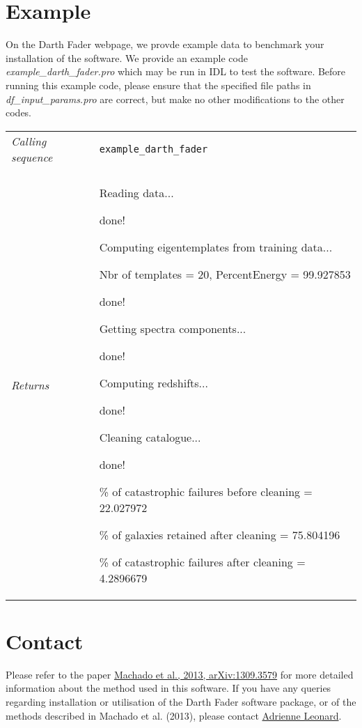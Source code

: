 \documentclass[a4paper]{article}
\begin{document}
\section{Example}

On the Darth Fader webpage, we provde example data to benchmark your installation of the software. We provide an example code {\em example\_darth\_fader.pro} which may be run in IDL to test the software. Before running this example code, please ensure that the specified file paths in {\em df\_input\_params.pro} are correct, but make no other modifications to the other codes. 

\noindent\begin{tabularx}{\textwidth}{LI}
{\em Calling sequence} & \texttt{example\_darth\_fader}\\
 & \\
{\em Returns} & Reading data...

done!

Computing eigentemplates from training data...

Nbr of templates =           20, PercentEnergy =        99.927853

done!

Getting spectra components...

done!

Computing redshifts...

done!

Cleaning catalogue...

done!

\% of catastrophic failures before cleaning =        22.027972

\% of galaxies retained after cleaning =        75.804196

\% of catastrophic failures after cleaning =        4.2896679 
\end{tabularx}

\section{Contact}

Please refer to the paper {\color{blue}
  \href{http://arxiv.org/abs/1309.3579}{Machado et al., 2013,
    arXiv:1309.3579}} for more detailed information about the method
used in this software. If you have any queries regarding installation
or utilisation of the Darth Fader software package, or of the methods
described in Machado et al. (2013), please contact
\href{mailto:adrienne.leonard@cea.fr}{Adrienne Leonard}. 
\end{document}
